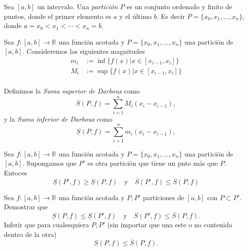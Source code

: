 \begin{definicion}[Partición]{} Sea $[a,b]$ un intervalo. Una {\em partición} $P$ es un conjunto ordenado y finito de puntos, donde el primer elemento es $a$ y el último $b$. Es decir $P=\{x_0,x_1,\ldots,x_n\}$, donde $a=x_0<x_1<\cdots<x_n=b$. 
 
\end{definicion}




\begin{definicion}{} Sea $f:[a,b]\to\mathbb{R}$ una función acotada y $P=\{x_0,x_1,\ldots,x_n\}$ una partición de $[a,b]$. Consideremos las siguientes magnitudes
\[
 \begin{split}
    m_i&:=\inf\{f(x)| x\in [x_{i-1},x_i]\}\\
    M_i&:=\sup\{f(x)| x\in [x_{i-1},x_i]\}\\
 \end{split}
\]

Definimos la \emph{Suma superior de Darboux} como
\[
 \overline{S}(P,f)=\sum_{i=1}^nM_i(x_i-x_{i-1}),
\]
y la \emph{Suma inferior de Darboux} como
\[
 \underline{S}(P,f)=\sum_{i=1}^nm_i(x_i-x_{i-1}),
\] 
\end{definicion}

\begin{lema}{}  Sea $f:[a,b]\to\mathbb{R}$ una función acotada y $P=\{x_0,x_1,\ldots,x_n\}$ una partición de $[a,b]$. Supongamos que $P'$ es otra partición que tiene un pnto más que $P$. Entoces
 \[
  \underline{S}(P',f)\geq \underline{S}(P,f)\quad\text{y}\quad \overline{S}(P',f)\leq \overline{S}(P,f)
 \]
\end{lema}

\begin{ejercicio}{} Sea $f:[a,b]\to\mathbb{R}$ una función acotada y $P,P'$ particiones de $[a,b]$ con $P\subset P'$. Demostrar que 
  \[
  \underline{S}(P,f)\leq \underline{S}(P',f)\quad\text{y}\quad \overline{S}(P',f)\leq \overline{S}(P,f).
 \]
 Inferir que para cualesquiera $P,P'$ (sin importar que una este o no contenida dentro de la otra)
   \[
\underline{S}(P,f)\leq \overline{S}(P,f).
 \]
 
\end{ejercicio}

